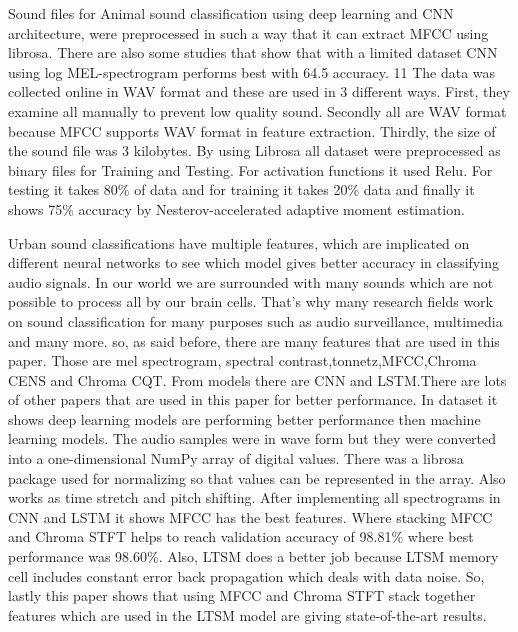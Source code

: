 Sound files for Animal sound classification using deep learning and CNN architecture, were preprocessed \parencite{8} in such a way that it can extract MFCC using librosa. There are also some studies that show that with a limited dataset CNN using log MEL-spectrogram performs best with 64.5 accuracy. 11 The data was collected online in WAV format and these are used in 3 different ways. First, they examine all manually to prevent low quality sound. Secondly all are WAV format because MFCC supports WAV format in feature extraction. Thirdly, the size of the sound file was 3 kilobytes. By using Librosa all dataset were preprocessed as binary files for Training and Testing. For activation functions it used Relu. For testing it takes 80\% of data and for training it takes 20\% data and finally it shows 75\% accuracy by Nesterov-accelerated adaptive moment estimation. 

Urban sound classifications have multiple features, which are implicated on different neural networks to see which model gives better accuracy in classifying audio signals. In our world we are surrounded with many sounds which are not possible to process all by our brain cells. That's why many research fields work on sound classification for many purposes such as audio surveillance, multimedia and many more. so, as said before, there are many features that are used in this paper. Those are mel spectrogram, spectral contrast,tonnetz,MFCC,Chroma CENS and Chroma CQT. From models there are CNN and LSTM.There are lots of other papers that are used in this paper for better performance. In dataset it shows deep learning models are performing better performance then machine learning models. The audio samples were in wave form but they were converted into a one-dimensional NumPy array of digital values. There was a librosa package used for normalizing so that values can be represented in the array. Also works as time stretch and pitch shifting. After implementing all spectrograms in CNN and LSTM it shows MFCC has the best features. Where stacking MFCC and Chroma STFT helps to reach validation accuracy of 98.81\% where best performance was 98.60\%. Also, LTSM does a better job because LTSM memory cell includes constant error back propagation which deals with data noise. So, lastly this paper shows that using MFCC and Chroma STFT stack together features which are used in the LTSM model are giving state-of-the-art results.

